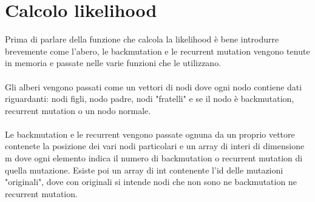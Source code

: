 \documentclass[12pt]{report}
\begin{document}
  \section{Calcolo likelihood}
  Prima di parlare della funzione che calcola la likelihood è bene introdurre brevemente come l'abero, le backmutation e le recurrent mutation vengono tenute in memoria e passate nelle varie funzioni che le utilizzano.\\\\
  Gli alberi vengono passati come un vettori di nodi dove ogni nodo contiene dati riguardanti: nodi figli, nodo padre, nodi "fratelli" e se il nodo è backmutation, recurrent mutation o un nodo normale.\\\\
  Le backmutation e le recurrent vengono passate ognuna da un proprio vettore contenete la posizione dei vari nodi particolari e un array di interi di dimensione m dove ogni elemento indica il numero di backmutation o recurrent mutation di quella mutazione. Esiste poi un array di int contenente l'id delle mutazioni "originali", dove con originali si intende nodi che non sono ne backmutation ne recurrent mutation.\\\\
\end{document}
